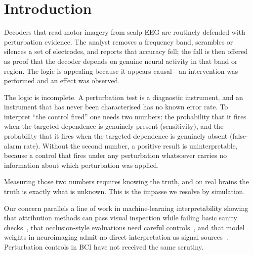 \documentclass[manuscript,nonacm]{acmart}
\begin{document}
\section{Introduction}
Decoders that read motor imagery from scalp EEG are routinely defended with perturbation
evidence. The analyst removes a frequency band, scrambles or silences a set of
electrodes, and reports that accuracy fell; the fall is then offered as proof that the
decoder depends on genuine neural activity in that band or region. The logic is
appealing because it appears causal---an intervention was performed and an effect was
observed.

The logic is incomplete. A perturbation test is a diagnostic instrument, and an
instrument that has never been characterised has no known error rate. To interpret ``the
control fired'' one needs two numbers: the probability that it fires when the targeted
dependence is genuinely present (sensitivity), and the probability that it fires when
the targeted dependence is genuinely absent (false-alarm rate). Without the second
number, a positive result is uninterpretable, because a control that fires under any
perturbation whatsoever carries no information about which perturbation was applied.

Measuring those two numbers requires knowing the truth, and on real brains the truth is
exactly what is unknown. This is the impasse we resolve by simulation.

Our concern parallels a line of work in machine-learning interpretability showing that
attribution methods can pass visual inspection while failing basic sanity
checks~\cite{adebayo2018sanity,kindermans2019}, that occlusion-style evaluations need
careful controls~\cite{hooker2019benchmark}, and that model weights in neuroimaging admit
no direct interpretation as signal sources~\cite{haufe2014,rudin2019stop}. Perturbation
controls in BCI have not received the same scrutiny.
\end{document}

